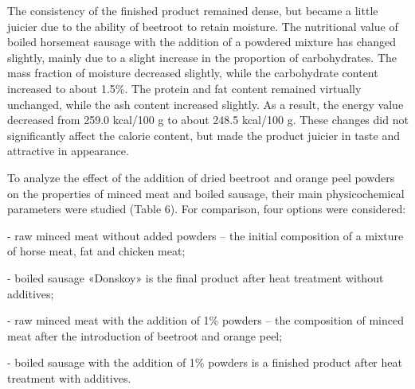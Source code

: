 \begin{multicols}{2}
The consistency of the finished product remained dense, but became a
little juicier due to the ability of beetroot to retain moisture. The
nutritional value of boiled horsemeat sausage with the addition of a
powdered mixture has changed slightly, mainly due to a slight increase
in the proportion of carbohydrates. The mass fraction of moisture
decreased slightly, while the carbohydrate content increased to about
1.5\%. The protein and fat content remained virtually unchanged, while
the ash content increased slightly. As a result, the energy value
decreased from 259.0 kcal/100 g to about 248.5 kcal/100 g. These changes
did not significantly affect the calorie content, but made the product
juicier in taste and attractive in appearance.

To analyze the effect of the addition of dried beetroot and orange peel
powders on the properties of minced meat and boiled sausage, their main
physicochemical parameters were studied (Table 6). For comparison, four
options were considered:

- raw minced meat without added powders -- the initial composition of a
mixture of horse meat, fat and chicken meat;

- boiled sausage «Donskoy» is the final product after heat treatment
without additives;

- raw minced meat with the addition of 1\% powders -- the composition of
minced meat after the introduction of beetroot and orange peel;

- boiled sausage with the addition of 1\% powders is a finished product
after heat treatment with additives.
\end{multicols}


